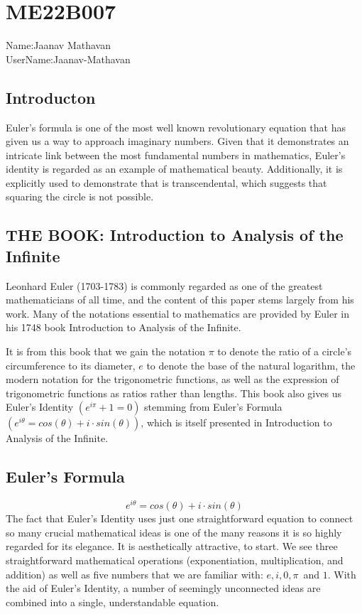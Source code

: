 \section{ME22B007}
Name:Jaanav Mathavan\\
UserName:Jaanav-Mathavan\\
\subsection{Introducton}
Euler's formula is one of the most well known revolutionary equation that has given us a way to approach imaginary numbers. Given that it demonstrates an intricate link between the most fundamental numbers in mathematics, Euler's identity is regarded as an example of mathematical beauty. Additionally, it is explicitly used to demonstrate that is transcendental, which suggests that squaring the circle is not possible.
\subsection{THE BOOK: Introduction to Analysis of the Infinite}
Leonhard Euler (1703-1783) is commonly regarded as one of the greatest mathematicians of all time, and the content of this paper stems largely from his work.
Many of the notations essential to mathematics are provided by Euler in his 1748 book Introduction to Analysis of the Infinite.

It is from this book that we gain the
notation $\pi$ to denote the ratio of a circle’s circumference to its diameter, $e$ to denote the base
of the natural logarithm, the modern notation for the trigonometric functions, as well as the
expression of trigonometric functions as ratios rather than lengths. This book also gives us
Euler’s Identity $(e^{i\pi} + 1 = 0)$ stemming from Euler’s Formula $(e^{i\theta} = cos(\theta) + i \cdot sin(\theta))$, which
is itself presented in Introduction to Analysis of the Infinite.

\subsection{Euler's Formula}
$$e^{i \theta}=cos(\theta)+i \cdot sin(\theta)$$
The fact that Euler's Identity uses just one straightforward equation to connect so many crucial mathematical ideas is one of the many reasons it is so highly regarded for its elegance. It is aesthetically attractive, to start. We see three straightforward mathematical operations (exponentiation, multiplication, and addition) as well as five numbers that we are familiar with: $e, i,0, \pi$ and $ 1.$ With the aid of Euler's Identity, a number of seemingly unconnected ideas are combined into a single, understandable equation.
